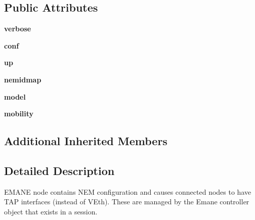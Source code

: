 \subsection*{Public Attributes}
\begin{DoxyCompactItemize}
\item 
\hypertarget{classcore_1_1emane_1_1nodes_1_1_emane_node_a4ad62e47a5988a9b02a4c639edc36aff}{{\bfseries verbose}}\label{classcore_1_1emane_1_1nodes_1_1_emane_node_a4ad62e47a5988a9b02a4c639edc36aff}

\item 
\hypertarget{classcore_1_1emane_1_1nodes_1_1_emane_node_a817c8d1be779c7dccad5ea804f08c59c}{{\bfseries conf}}\label{classcore_1_1emane_1_1nodes_1_1_emane_node_a817c8d1be779c7dccad5ea804f08c59c}

\item 
\hypertarget{classcore_1_1emane_1_1nodes_1_1_emane_node_a3d76350c5a63decd8eed019d3cb8259e}{{\bfseries up}}\label{classcore_1_1emane_1_1nodes_1_1_emane_node_a3d76350c5a63decd8eed019d3cb8259e}

\item 
\hypertarget{classcore_1_1emane_1_1nodes_1_1_emane_node_afa1023fb592fe02c63f191f904b81727}{{\bfseries nemidmap}}\label{classcore_1_1emane_1_1nodes_1_1_emane_node_afa1023fb592fe02c63f191f904b81727}

\item 
\hypertarget{classcore_1_1emane_1_1nodes_1_1_emane_node_ad99095d0ac627e912e9ae7fa21a0808c}{{\bfseries model}}\label{classcore_1_1emane_1_1nodes_1_1_emane_node_ad99095d0ac627e912e9ae7fa21a0808c}

\item 
\hypertarget{classcore_1_1emane_1_1nodes_1_1_emane_node_a2e416a7b005abe4ae65c65e5b5bb0263}{{\bfseries mobility}}\label{classcore_1_1emane_1_1nodes_1_1_emane_node_a2e416a7b005abe4ae65c65e5b5bb0263}

\end{DoxyCompactItemize}
\subsection*{Additional Inherited Members}


\subsection{Detailed Description}
\begin{DoxyVerb}EMANE node contains NEM configuration and causes connected nodes
    to have TAP interfaces (instead of VEth). These are managed by the
    Emane controller object that exists in a session.
\end{DoxyVerb}
 

